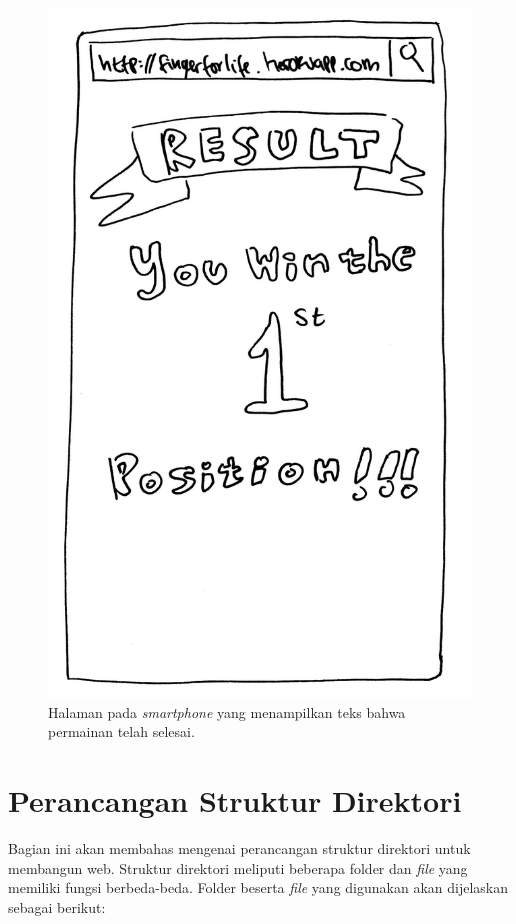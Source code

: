 \begin{enumerate}
\begin{figure}[H]
	\centering
	\includegraphics[scale=0.1]{Gambar/mob6_win}
	\caption{Halaman pada \textit{smartphone} yang menampilkan teks bahwa permainan telah selesai.}
	\label{fig:mob6_win}
\end{figure}
	
\end{enumerate}

\section{Perancangan Struktur Direktori}

Bagian ini akan membahas mengenai perancangan struktur direktori untuk membangun web. Struktur direktori meliputi beberapa folder dan \textit{file} yang memiliki fungsi berbeda-beda. Folder beserta \textit{file} yang digunakan akan dijelaskan sebagai berikut:

